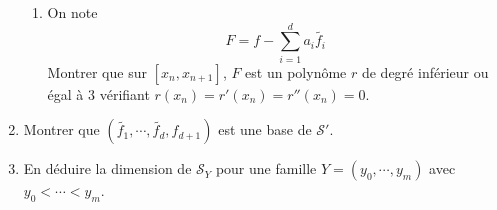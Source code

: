 \begin{enumerate}
\begin{enumerate}
    \item On note 
\begin{displaymath}
F = f-\sum\limits_{i=1}^{d} a_i \widetilde{f_i}  
\end{displaymath}
Montrer que sur $[x_n,x_{n+1}]$, $F$ est un polynôme $r$ de degré inférieur ou égal à $3$ vérifiant $r(x_n) = r'(x_n) = r''(x_n)=0$.
\end{enumerate}

\item Montrer que $(\widetilde{f_1},\cdots,\widetilde{f_{d}},f_{d+1})$ est une base de $\mathcal{S}'$.

\item En déduire la dimension de $\mathcal{S}_Y$ pour une famille $Y=(y_0,\cdots,y_m)$ avec $y_0< \cdots < y_m$.
\end{enumerate}

